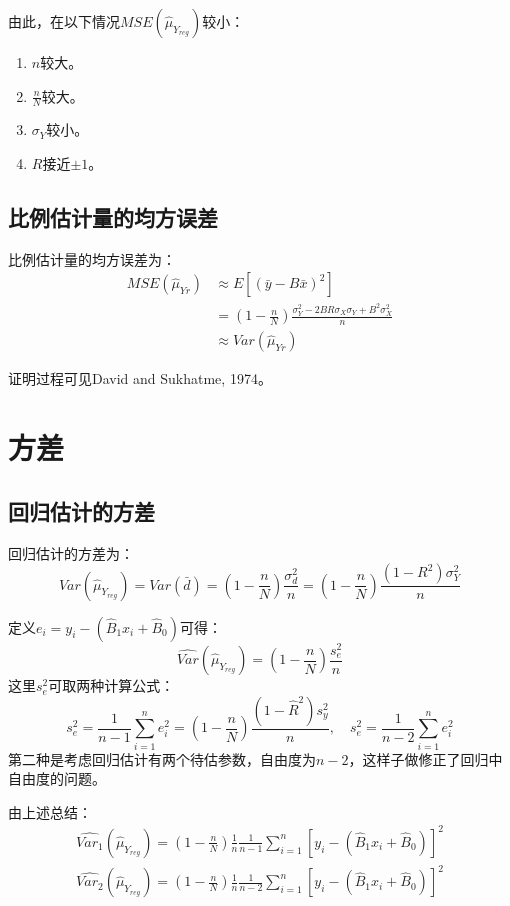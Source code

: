 由此，在以下情况$MSE(\hat{\mu}_{Y_{reg}})$较小：
\begin{enumerate}
	\item $n$较大。
	\item $\frac{n}{N}$较大。
	\item $\sigma_Y$较小。
	\item $R$接近$\pm 1$。
\end{enumerate}


\subsection{比例估计量的均方误差}
\begin{theorem}
	比例估计量的均方误差为：
	\begin{align*}
		MSE(\hat{\mu}_{Yr})&\approx E\left[(\bar{y}-B\bar{x})^2\right] \\
		&=\left(1-\frac{n}{N}\right)\frac{\sigma_Y^2-2BR\sigma_X\sigma_Y+B^2\sigma_X^2}{n} \\
		&\approx Var(\hat{\mu}_{Yr})
	\end{align*}
\end{theorem}
证明过程可见David and Sukhatme, 1974。

\section{方差}
\subsection{回归估计的方差}
\begin{theorem}
	回归估计的方差为：
	\begin{equation*}
		Var(\hat{\mu}_{Y_{reg}})=Var(\bar{d})=\left(1-\frac{n}{N}\right)\frac{\sigma_d^2}{n}=\left(1-\frac{n}{N}\right)\frac{(1-R^2)\sigma_Y^2}{n}
	\end{equation*}
\end{theorem}
定义$e_i=y_i-(\hat{B}_1x_i+\hat{B}_0)$可得：
\begin{equation*}
	\widehat{Var}(\hat{\mu}_{Y_{reg}})=\left(1-\frac{n}{N}\right)\frac{s_e^2}{n}
\end{equation*}
这里$s_e^2$可取两种计算公式：
\begin{equation*}
	s_e^2=\frac{1}{n-1}\sum_{i=1}^ne_i^2=\left(1-\frac{n}{N}\right)\frac{(1-\hat{R}^2)s_y^2}{n},\quad
	s_e^2=\frac{1}{n-2}\sum_{i=1}^ne_i^2
\end{equation*}
第二种是考虑回归估计有两个待估参数，自由度为$n-2$，这样子做修正了回归中自由度的问题。\par
由上述总结：
\begin{gather*}
	\widehat{Var_1}(\hat{\mu}_{Y_{reg}})=\left(1-\frac{n}{N}\right)\frac{1}{n}\frac{1}{n-1}\sum_{i=1}^n\left[y_i-(\hat{B}_1x_i+\hat{B}_0)\right]^2 \\
	\widehat{Var_2}(\hat{\mu}_{Y_{reg}})=\left(1-\frac{n}{N}\right)\frac{1}{n}\frac{1}{n-2}\sum_{i=1}^n\left[y_i-(\hat{B}_1x_i+\hat{B}_0)\right]^2 
\end{gather*}

